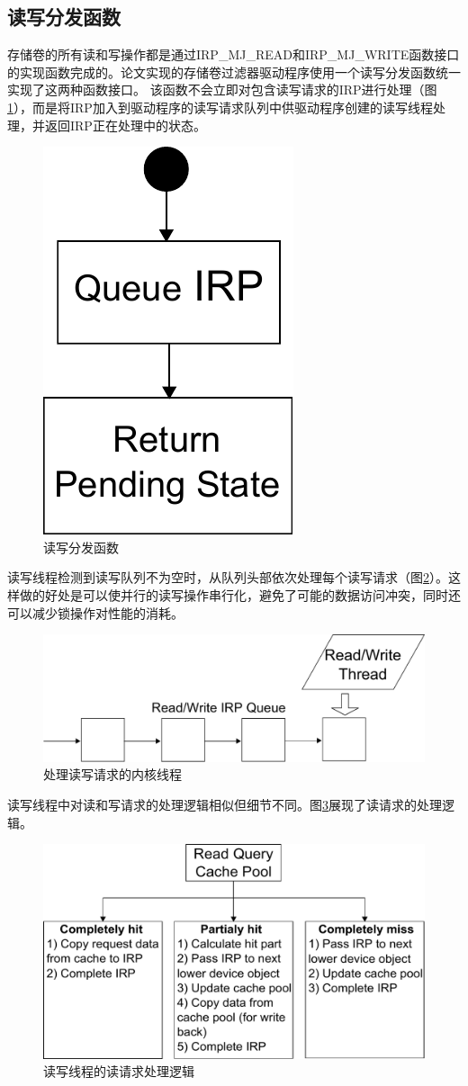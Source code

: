 \subsection{读写分发函数}

存储卷的所有读和写操作都是通过IRP\_MJ\_READ和IRP\_MJ\_WRITE函数接口的实现函数完成的。论文实现的存储卷过滤器驱动程序使用一个读写分发函数统一实现了这两种函数接口。
该函数不会立即对包含读写请求的IRP进行处理（图\ref{fig:df-rw}），而是将IRP加入到驱动程序的读写请求队列中供驱动程序创建的读写线程处理，并返回IRP正在处理中的状态。

\begin{figure}[!ht]
\centering
\includegraphics[width=0.2\linewidth]{./graph/df-rw}
\caption{读写分发函数}
\label{fig:df-rw}
\end{figure}

读写线程检测到读写队列不为空时，从队列头部依次处理每个读写请求（图\ref{fig:df-rw-thread}）。这样做的好处是可以使并行的读写操作串行化，避免了可能的数据访问冲突，同时还可以减少锁操作对性能的消耗。

\begin{figure}[!ht]
\centering
\includegraphics[width=0.75\linewidth]{./graph/df-rw-thread}
\caption{处理读写请求的内核线程}
\label{fig:df-rw-thread}
\end{figure}

读写线程中对读和写请求的处理逻辑相似但细节不同。图\ref{fig:df-proc-read}展现了读请求的处理逻辑。

\begin{figure}[!ht]
\centering
\includegraphics[width=0.8\linewidth]{./graph/df-proc-read}
\caption{读写线程的读请求处理逻辑}
\label{fig:df-proc-read}
\end{figure}

